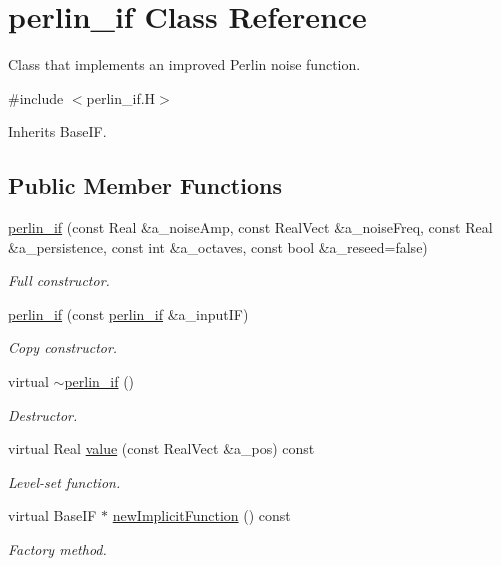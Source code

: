 \hypertarget{classperlin__if}{}\section{perlin\+\_\+if Class Reference}
\label{classperlin__if}


Class that implements an improved Perlin noise function.  




{\ttfamily \#include $<$perlin\+\_\+if.\+H$>$}



Inherits Base\+IF.

\subsection*{Public Member Functions}
\begin{DoxyCompactItemize}
\item 
\hyperlink{classperlin__if_a5e48bce0228769be9ac6a836a2a80f8e}{perlin\+\_\+if} (const Real \&a\+\_\+noise\+Amp, const Real\+Vect \&a\+\_\+noise\+Freq, const Real \&a\+\_\+persistence, const int \&a\+\_\+octaves, const bool \&a\+\_\+reseed=false)
\begin{DoxyCompactList}\small\item\em Full constructor. \end{DoxyCompactList}\item 
\hyperlink{classperlin__if_af26c930d5d28302871b44329da831cb8}{perlin\+\_\+if} (const \hyperlink{classperlin__if}{perlin\+\_\+if} \&a\+\_\+input\+IF)
\begin{DoxyCompactList}\small\item\em Copy constructor. \end{DoxyCompactList}\item 
virtual \hyperlink{classperlin__if_a3141688307c223fcbc4cd768ce1e67af}{$\sim$perlin\+\_\+if} ()
\begin{DoxyCompactList}\small\item\em Destructor. \end{DoxyCompactList}\item 
virtual Real \hyperlink{classperlin__if_a20d94fc8c5ae6b54b5ff80e0972a4ee1}{value} (const Real\+Vect \&a\+\_\+pos) const 
\begin{DoxyCompactList}\small\item\em Level-\/set function. \end{DoxyCompactList}\item 
virtual Base\+IF $\ast$ \hyperlink{classperlin__if_a4e3d16955c3420401a05b35554eb4d46}{new\+Implicit\+Function} () const 
\begin{DoxyCompactList}\small\item\em Factory method. \end{DoxyCompactList}\end{DoxyCompactItemize}
